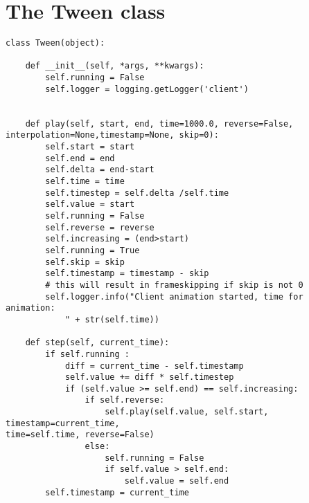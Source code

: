 \chapter{The Tween class}
\begin{verbatim}
class Tween(object):

    def __init__(self, *args, **kwargs):
        self.running = False
        self.logger = logging.getLogger('client')


    def play(self, start, end, time=1000.0, reverse=False,
interpolation=None,timestamp=None, skip=0):
        self.start = start
        self.end = end
        self.delta = end-start
        self.time = time
        self.timestep = self.delta /self.time
        self.value = start
        self.running = False
        self.reverse = reverse
        self.increasing = (end>start)
        self.running = True
        self.skip = skip
        self.timestamp = timestamp - skip  
		# this will result in frameskipping if skip is not 0
        self.logger.info("Client animation started, time for animation: 
			" + str(self.time))

    def step(self, current_time):
        if self.running :
            diff = current_time - self.timestamp
            self.value += diff * self.timestep
            if (self.value >= self.end) == self.increasing:
                if self.reverse:
                    self.play(self.value, self.start, timestamp=current_time,
time=self.time, reverse=False)
                else:
                    self.running = False
                    if self.value > self.end:
                        self.value = self.end
        self.timestamp = current_time

\end{verbatim}
